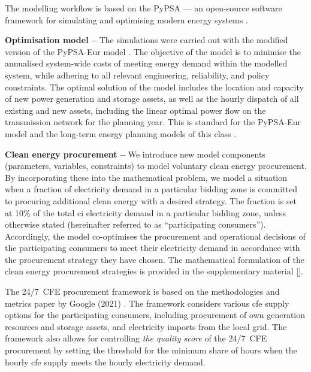 The modelling workflow is based on the PyPSA --- an open-source software framework for simulating and optimising modern energy systems \cite{brownPyPSAPythonPower2018}. 

\textbf{Optimisation model --} The simulations were carried out with the modified version of the PyPSA-Eur model \cite{PyPSA-Eur-github}. 
The objective of the model is to minimise the annualised system-wide costs of meeting energy demand within the modelled system, while adhering to all relevant engineering, reliability, and policy constraints.
The optimal solution of the model includes the location and capacity of new power generation and storage assets, as well as the hourly dispatch of all existing and new assets, including the linear optimal power flow on the transmission network for the planning year. This is standard for the PyPSA-Eur model \cite{horschPyPSAEurOpenOptimisation2018} and the long-term energy planning models of this class \cite{jenkinsGenX2022, howellsOSeMOSYSOpenSource2011}.

\textbf{Clean energy procurement --} We introduce new model components (parameters, variables, constraints) to model voluntary clean energy procurement.
By incorporating these into the mathematical problem, we model a situation when a fraction of electricity demand in a particular bidding zone is committed to procuring additional clean energy with a desired strategy.
The fraction is set at 10\% of the total \gls{ci} electricity demand in a particular bidding zone, unless otherwise stated (hereinafter referred to as \enquote{participating consumers}).
Accordingly, the model co-optimises the procurement and operational decisions of the participating consumers to meet their electricity demand in accordance with the procurement strategy they have chosen.
The mathematical formulation of the clean energy procurement strategies is provided in the supplementary material [].

The 24/7~CFE procurement framework is based on the methodologies and metrics paper by Google (2021) \cite{google-methodologies}.
The framework considers various \gls{cfe} supply options for the participating consumers, including procurement of own generation resources and storage assets, and electricity imports from the local grid.
The framework also allows for controlling \textit{the quality score} of the 24/7~CFE procurement by setting the threshold for the minimum share of hours when the hourly \gls{cfe} supply meets the hourly electricity demand. 

